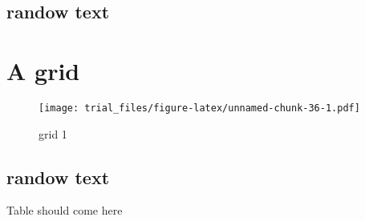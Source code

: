 \documentclass[]{article}
\begin{document}
\subsection{randow text}\label{randow-text-19}

\lipsum

\section{A grid}\label{a-grid-9}

\begin{figure}[htbp]
\centering
\texttt{[image: trial\_files/figure-latex/unnamed-chunk-36-1.pdf]}
\caption{grid 1}
\end{figure}

\subsection{randow text}\label{randow-text-20}

\lipsum

Table should come here
\end{document}
